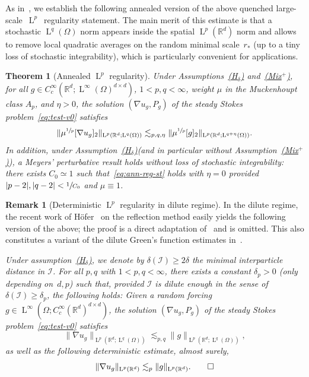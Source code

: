 \documentclass[10pt]{amsart}
\let\mathcal\mathscr
\newcounter{assumption}
\newcommand{\Hd}{\hyperref[Hd]{\textup{(H$_\delta$)}}\xspace}
\newcommand{\Mix}{\hyperref[Mix+]{\textup{(Mix$^+$)}}\xspace}
\theoremstyle{plain}
\newtheorem{theor1}{Theorem}
\theoremstyle{definition}
\newtheorem{rem}[theor]{Remark}
\newcommand{\R}{\mathbb R}
\newcommand{\Ic}{\mathcal I}
\newcommand{\Ld}{\operatorname{L}}
\begin{document}
As in~\cite{DG-20}, we establish the following annealed version of the above quenched large-scale~$\Ld^p$~regularity statement.
The main merit of this estimate is that a stochastic $\Ld^q(\Omega)$ norm appears inside the spatial $\Ld^p(\R^d)$ norm and allows to remove local quadratic averages on the random minimal scale~$r_*$ (up to a tiny loss of stochastic integrability), which is particularly convenient for applications.

\begin{theor1}[Annealed $\Ld^p$ regularity]\label{th:ann-reg}
Under Assumptions~\Hd and~\Mix, for all $g\in C^\infty_c(\R^d;\Ld^\infty(\Omega)^{d\times d})$, $1<p,q<\infty$, weight $\mu$ in the Muckenhoupt class $A_p$, and $\eta>0$, the solution $(\nabla u_g,P_g)$ of the steady Stokes problem~\eqref{eq:test-v0} satisfies
\begin{equation}\label{eq:ann-reg-st}
\|\mu^{\sfrac1p}[\nabla u_g]_2\|_{\Ld^p(\R^d;\Ld^q(\Omega))}\lesssim_{p,q,\eta}\|\mu^{\sfrac1p}[g]_2\|_{\Ld^p(\R^d;\Ld^{q+\eta}(\Omega))}.
\end{equation}
In addition, under Assumption~\Hd (and in particular without Assumption~\Mix), a Meyers' perturbative result holds without loss of stochastic integrability: there exists $C_0\simeq1$ such that~\eqref{eq:ann-reg-st} holds with $\eta=0$ provided $|p-2|,|q-2|<\sfrac1{C_0}$ and $\mu\equiv1$.
\end{theor1}

\begin{rem}[Deterministic $\Ld^p$ regularity in dilute regime]\label{rem:reg-hofer}
In the dilute regime, the recent work of Höfer~\cite{Hofer-19} on the reflection method
easily yields the following version of the above; the proof is a direct adaptation of~\cite{Hofer-19} and is omitted.
This also constitutes a variant of the dilute Green's function estimates in~\cite[Lem.\,2.7]{Gloria-19}.

{\it Under assumption~\Hd, we denote by $\delta(\Ic)\ge2\delta$ the minimal interparticle distance in $\Ic$.
For all $p,q$ with $1<p,q<\infty$, there exists a constant $\delta_{p}>0$ (only depending on~$d,p$) such that, provided $\Ic$ is dilute enough in the sense of $\delta(\Ic)\ge\delta_{p}$, the following holds: Given a random forcing $g\in\Ld^\infty(\Omega;C^\infty_c(\R^d)^{d\times d})$, the solution $(\nabla u_g,P_g)$ of the steady Stokes problem~\eqref{eq:test-v0} satisfies
\[\|\nabla u_g\|_{\Ld^p(\R^d;\Ld^q(\Omega))}\lesssim_{p,q}\|g\|_{\Ld^p(\R^d;\Ld^q(\Omega))},\]
as well as the following deterministic estimate, almost surely,
\[\|\nabla u_g\|_{\Ld^p(\R^d)}\lesssim_{p}\|g\|_{\Ld^p(\R^d)}.\qedhere\]
}
\end{rem}
\end{document}
